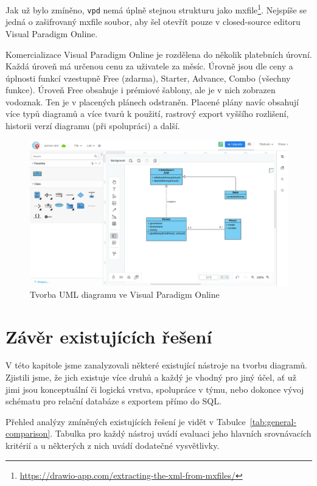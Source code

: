 Jak už bylo zmíněno, \texttt{vpd} nemá úplně stejnou strukturu jako mxfile\footnote{\url{https://drawio-app.com/extracting-the-xml-from-mxfiles/}}.
Nejspíše se jedná o zašifrovaný mxfile soubor, aby šel otevřít pouze v closed-source editoru Visual Paradigm Online.

Komercializace Visual Paradigm Online je rozdělena do několik platebních úrovní.
Každá úroveň má určenou cenu za uživatele za měsíc.
Úrovně jsou dle ceny a úplnosti funkcí vzestupně Free (zdarma), Starter, Advance, Combo (všechny funkce).
Úroveň Free obsahuje i prémiové šablony, ale je v nich zobrazen vodoznak.
Ten je v placených plánech odstraněn.
Placené plány navíc obsahují více typů diagramů a více tvarů k použití, rastrový export vyššího rozlišení, historii verzí diagramu (při spolupráci) a další.

\begin{figure}[!htb]
  \centering
  \includegraphics[width = \maxwidth{\textwidth}]{../img/visual-paradigm-online.png}
  \caption{Tvorba UML diagramu ve Visual Paradigm Online}
  \label{fig:vpo}
\end{figure}
\section{Závěr existujících řešení}

V této kapitole jsme zanalyzovali některé existující nástroje na tvorbu diagramů.
Zjistili jsme, že jich existuje více druhů a každý je vhodný pro jiný účel, ať už jimi jsou konceptuální či logická vrstva, spolupráce v týmu, nebo dokonce vývoj schématu pro relační databáze s exportem přímo do SQL.

Přehled analýzy zmíněných existujících řešení je vidět v Tabulce~\ref{tab:general-comparison}.
Tabulka pro každý nástroj uvádí evaluaci jeho hlavních srovnávacích kritérií a u některých z nich uvádí dodatečné vysvětlivky.

